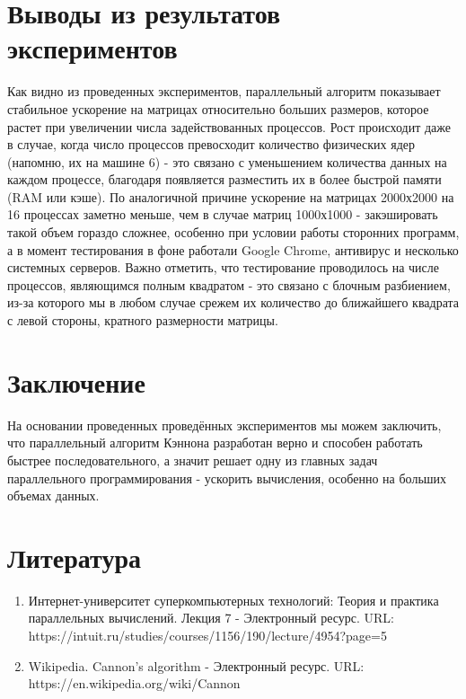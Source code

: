 \documentclass{report}
\begin{document}
\section*{Выводы из результатов экспериментов}
Как видно из проведенных экспериментов, параллельный алгоритм показывает стабильное ускорение на матрицах относительно больших размеров, которое растет при увеличении числа задействованных процессов. Рост происходит даже в случае, когда число процессов превосходит количество физических ядер (напомню, их на машине 6) - это связано с уменьшением количества данных на каждом процессе, благодаря появляется разместить их в более быстрой памяти (RAM или кэше). По аналогичной причине ускорение на матрицах 2000х2000 на 16 процессах заметно меньше, чем в случае матриц 1000х1000 - закэшировать такой объем гораздо сложнее, особенно при условии работы сторонних программ, а в момент тестирования в фоне работали Google Chrome, антивирус и несколько системных серверов.
Важно отметить, что тестирование проводилось на числе процессов, являющимся полным квадратом - это связано с блочным разбиением, из-за которого мы в любом случае срежем их количество до ближайшего квадрата с левой стороны, кратного размерности матрицы.
 

\newpage

\section*{Заключение}
На основании проведенных проведённых экспериментов мы можем заключить, что параллельный алгоритм Кэннона разработан верно и способен работать быстрее последовательного, а значит решает одну из главных задач параллельного программирования - ускорить вычисления, особенно на больших объемах данных.
\newpage

\section*{Литература}
\begin{enumerate}
\item Интернет-университет суперкомпьютерных технологий: Теория и практика параллельных вычислений. Лекция 7 - Электронный ресурс. \newline URL: https://intuit.ru/studies/courses/1156/190/lecture/4954?page=5
\item Wikipedia. Cannon's algorithm - Электронный ресурс. \newline URL: https://en.wikipedia.org/wiki/Cannon%
\end{enumerate} 
\newpage
\end{document}
